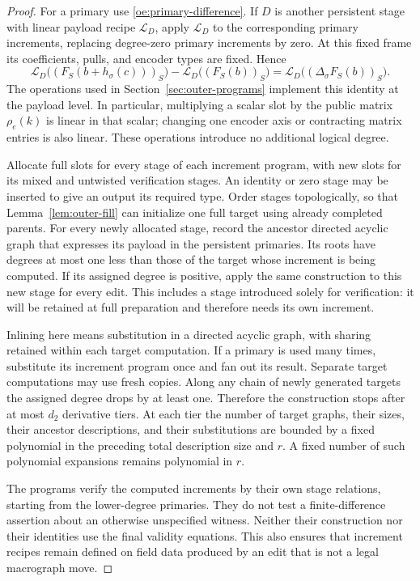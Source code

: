 \begin{proof}
For a primary use \eqref{oe:primary-difference}. If $D$ is another
persistent stage with linear payload recipe $\mathcal L_D$, apply
$\mathcal L_D$ to the corresponding primary increments, replacing
degree-zero primary increments by zero. At this fixed frame its
coefficients, pulls, and encoder types are fixed. Hence
\[
 \mathcal L_D\bigl((F_S(b+h_\sigma(c)))_S\bigr)
 -\mathcal L_D\bigl((F_S(b))_S\bigr)
 =\mathcal L_D\bigl((\Delta_\sigma F_S(b))_S\bigr).
\]
The operations used in Section~\ref{sec:outer-programs} implement this
identity at the payload level. In particular, multiplying a scalar slot
by the public matrix $\rho_e(k)$ is linear in that scalar; changing one
encoder axis or contracting matrix entries is also linear. These
operations introduce no additional logical degree.

Allocate full slots for every stage of each increment program, with new
slots for its mixed and untwisted verification stages. An identity or zero
stage may be inserted to give an output its required type. Order stages
topologically, so that Lemma~\ref{lem:outer-fill} can initialize one full
target using already completed parents. For every newly allocated stage,
record the ancestor directed acyclic graph that expresses its payload in
the persistent primaries. Its roots have degrees at most one less than
those of the target whose increment is being computed. If its assigned
degree is positive, apply the same construction to this new stage for
every edit. This includes a stage introduced solely for verification: it
will be retained at full preparation and therefore needs its own
increment.

Inlining here means substitution in a directed acyclic graph, with
sharing retained within each target computation. If a primary is used
many times, substitute its increment program once and fan out its result.
Separate target computations may use fresh copies. Along any chain of
newly generated targets the assigned degree drops by at least one.
Therefore the construction stops after at most $d_2$ derivative tiers.
At each tier the number of target graphs, their sizes, their ancestor
descriptions, and their substitutions are bounded by a fixed polynomial
in the preceding total description size and $r$. A fixed number of such
polynomial expansions remains polynomial in $r$.

The programs verify the computed increments by their own stage
relations, starting from the lower-degree primaries. They do not test a
finite-difference assertion about an otherwise unspecified witness.
Neither their construction nor their identities use the final validity
equations. This also ensures that increment recipes remain defined on
field data produced by an edit that is not a legal macrograph move.
\end{proof}

